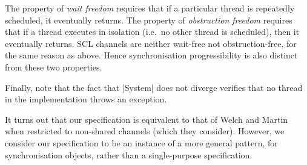 The property of \emph{wait freedom} requires that if a particular thread is
repeatedly scheduled, it eventually returns.  The property of
\emph{obstruction freedom} requires that if a thread executes in isolation
(i.e.~no other thread is scheduled), then it eventually returns.  SCL channels
are neither wait-free not obstruction-free, for the same reason as above.
Hence synchronisation progressibility is also distinct from these two
properties.



Finally, note that the fact that |System| does not diverge verifies that no
thread in the implementation throws an exception. 


It turns out that our specification is equivalent to that of Welch and
Martin~\cite{welch-martin} when restricted to non-shared channels (which they
consider).  However, we consider our specification to be an instance of a more
general pattern, for synchronisation objects, rather than a single-purpose
specification.
